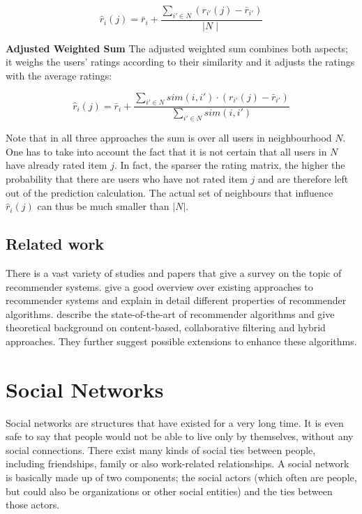 \begin{equation}
\hat{r}_i(j) = \bar{r}_i + \frac{\sum_{i' \in N}{(r_{i'}(j) - \bar{r}_{i'})}}{\mid N\mid}
\label{eq:adjustedsum}
\end{equation}
\newline

\textbf{Adjusted Weighted Sum} The adjusted weighted sum combines both aspects; it weighs the users' ratings according to their similarity and it adjusts the ratings with the average ratings:

\begin{equation}
\hat{r}_i(j) =  \bar{r}_i + \frac{\sum_{i' \in N}{sim(i,i')\cdot (r_{i'}(j) - \bar{r}_{i'})}}{\sum_{i' \in N}{sim(i,i')}}
\label{eq:adjustedweightedsum}
\end{equation}

Note that in all three approaches the sum is over all users in neighbourhood $N$. One has to take into account the fact that it is not certain that all users in $N$ have already rated item $j$. In fact, the sparser the rating matrix, the higher the probability that there are users who have not rated item $j$ and are therefore left out of the prediction calculation. The actual set of neighbours that influence $\hat{r}_i(j)$ can thus be much smaller than $\lvert N \rvert$.

\subsection{Related work}
\label{sst:rsrelatedwork} There is a vast variety of studies and papers that give a survey on the topic of recommender systems. \cite{Ricci_2011} give a good overview over existing approaches to recommender systems and explain in detail different properties of recommender algorithms. \cite{Adomavicius_2005} describe the state-of-the-art of recommender algorithms and give theoretical background on content-based, collaborative filtering and hybrid approaches. They further suggest possible extensions to enhance these algorithms.

\section{Social Networks}
\label{s:socialnetworks} Social networks are structures that have existed for a very long time. It is even safe to say that people would not be able to live only by themselves, without any social connections. There exist many kinds of social ties between people, including friendships, family or also work-related relationships. A social network is basically made up of two components; the social actors (which often are people, but could also be organizations or other social entities) and the ties between those actors.

